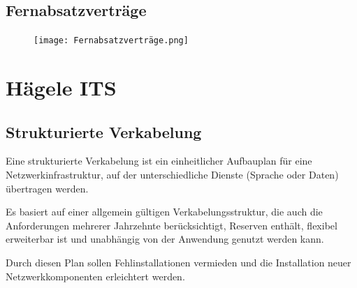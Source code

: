 \documentclass[10pt]{article}
\begin{document}
\subsection{Fernabsatzverträge}
\begin{figure}[H]
\begin{center}
  \texttt{[image: Fernabsatzverträge.png]}
  \end{center}
  \label{fig:Fernabsatzverträge.png}
\end{figure} 

\section{Hägele ITS}

\subsection{Strukturierte Verkabelung}

Eine strukturierte Verkabelung ist ein einheitlicher Aufbauplan für eine Netzwerkinfrastruktur, auf der unterschiedliche Dienste (Sprache oder Daten) übertragen werden.

Es basiert auf einer allgemein gültigen Verkabelungsstruktur, die auch die Anforderungen mehrerer Jahrzehnte berücksichtigt, Reserven enthält, flexibel erweiterbar ist und unabhängig von der Anwendung genutzt werden kann.

Durch diesen Plan sollen Fehlinstallationen vermieden und die Installation neuer Netzwerkkomponenten erleichtert werden.

\break
\end{document}

